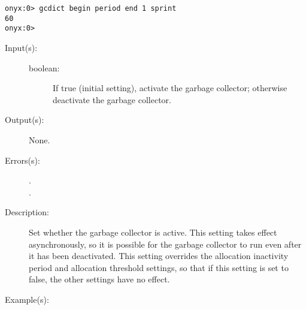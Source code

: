 \begin{description}
\begin{description}
\begin{verbatim}
onyx:0> gcdict begin period end 1 sprint
60
onyx:0>
		\end{verbatim}
	\end{description}
\label{gcdict:setactive}
\item[{\onyxop{boolean}{setactive}{--}}: ]
	\begin{description}\item[]
	\item[Input(s): ]
		\begin{description}\item[]
		\item[boolean: ]
			If true (initial setting), activate the garbage
			collector; otherwise deactivate the garbage collector.
		\end{description}
	\item[Output(s): ] None.
	\item[Errors(s): ]
		\begin{description}\item[]
		\item[.]
		\item[.]
		\end{description}
	\item[Description: ]
		Set whether the garbage collector is active.  This setting takes
		effect asynchronously, so it is possible for the garbage
		collector to run even after it has been deactivated.  This
		setting overrides the allocation inactivity period and
		allocation threshold settings, so that if this setting is set to
		false, the other settings have no effect.
	\item[Example(s): ]\begin{verbatim}


\end{verbatim}
\end{description}
\end{description}
